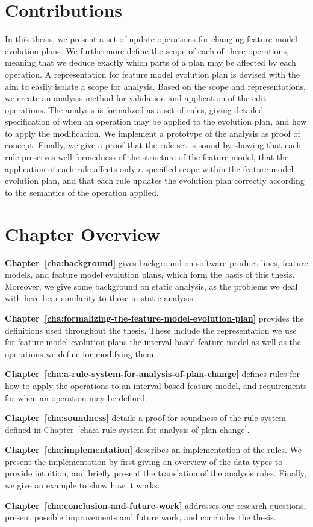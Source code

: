 \section{Contributions}

In this thesis, we present a set of update operations for changing feature model evolution plans. We furthermore define the scope of each of these operations, meaning that we deduce exactly which parts of a plan may be affected by each operation. A representation for feature model evolution plan is devised with the aim to easily isolate a scope for analysis. Based on the scope and representations, we create an analysis method for validation and application of the edit operations. The analysis is formalized as a set of rules, giving detailed specification of when an operation may be applied to the evolution plan, and how to apply the modification. We implement a prototype of the analysis as proof of concept. Finally, we give a proof that the rule set is sound by showing that each rule preserves well-formedness of the structure of the feature model, that the application of each rule affects only a specified scope within the feature model evolution plan, and that each rule updates the evolution plan correctly according to the semantics of the operation applied.

\section{Chapter Overview}
\label{sec:chapter-overview}

\textbf{Chapter~\ref{cha:background}} gives background on software product lines, feature models, and feature model evolution plans, which form the basis of this thesis. Moreover, we give some background on static analysis, as the problems we deal with here bear similarity to those in static analysis.

\textbf{Chapter~\ref{cha:formalizing-the-feature-model-evolution-plan}} provides the definitions used throughout the thesis. These include the representation we use for feature model evolution plans \textemdash{} the interval-based feature model \textemdash{} as well as the operations we define for modifying them. 

\textbf{Chapter~\ref{cha:a-rule-system-for-analysis-of-plan-change}} defines rules for how to apply the operations to an interval-based feature model, and requirements for when an operation may be defined.

\textbf{Chapter~\ref{cha:soundness}} details a proof for soundness of the rule system defined in Chapter~\vref{cha:a-rule-system-for-analysis-of-plan-change}.

\textbf{Chapter~\ref{cha:implementation}} describes an implementation of the rules. We present the implementation by first giving an overview of the data types to provide intuition, and briefly present the translation of the analysis rules. Finally, we give an example to show how it works.

\textbf{Chapter~\ref{cha:conclusion-and-future-work}} addresses our research questions, present possible improvements and future work, and concludes the thesis.

